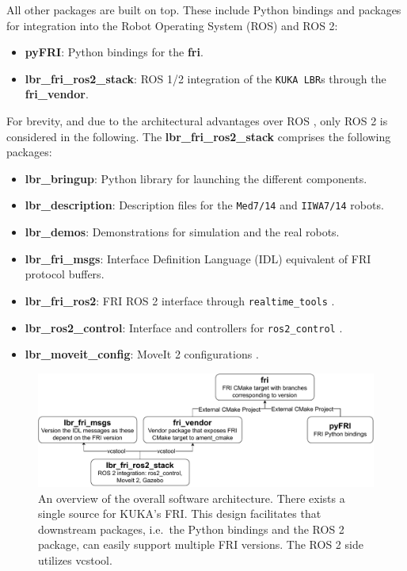 All other packages are built on top. These include Python bindings and
packages for integration into the Robot Operating System (ROS) and ROS
2:

\begin{itemize}
\item
  \textbf{pyFRI}: Python bindings for the \textbf{fri}.
\item
  \textbf{lbr\_fri\_ros2\_stack}: ROS 1/2 integration of the
  \texttt{KUKA\ LBR}s through the \textbf{fri\_vendor}.
\end{itemize}

For brevity, and due to the architectural advantages over ROS
\cite{ref-ros2}, only ROS 2 is
considered in the following. The \textbf{lbr\_fri\_ros2\_stack}
comprises the following packages:

\begin{itemize}
\item
  \textbf{lbr\_bringup}: Python library for launching the different
  components.
\item
  \textbf{lbr\_description}: Description files for the \texttt{Med7/14}
  and \texttt{IIWA7/14} robots.
\item
  \textbf{lbr\_demos}: Demonstrations for simulation and the real
  robots.
\item
  \textbf{lbr\_fri\_msgs}: Interface Definition Language (IDL)
  equivalent of FRI protocol buffers.
\item
  \textbf{lbr\_fri\_ros2}: FRI ROS 2 interface through
  \texttt{realtime\_tools} \cite{ref-ros_control}.
\item
  \textbf{lbr\_ros2\_control}: Interface and controllers for
  \texttt{ros2\_control} \cite{ref-ros2_control}.
\item
  \textbf{lbr\_moveit\_config}: MoveIt 2 configurations
  \cite{ref-moveit}.
\end{itemize}

\begin{figure}
\centering
\includegraphics[width=\textwidth]{appendix_1/img/fri_dependency_architecture.pdf}
\caption[An overview of the overall software architecture. There exists
a single source for KUKA's FRI. This design facilitates that downstream
packages, i.e.~the Python bindings and the ROS 2 package, can easily
support multiple FRI versions. The ROS 2 side utilizes
vcstool.\label{fig:fri}]{An overview of the overall software
architecture. There exists a single source for KUKA's FRI. This design
facilitates that downstream packages, i.e.~the Python bindings and the
ROS 2 package, can easily support multiple FRI versions. The ROS 2 side
utilizes vcstool\footnotemark{}.\label{fig:fri}}
\end{figure}

